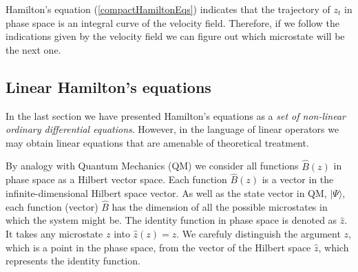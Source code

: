 \documentclass[b5paper,openright,11pt]{book}
\begin{document}
Hamilton's equation (\ref{compactHamiltonEqs}) indicates that the trajectory of $z_t$ in phase space is an integral curve of the velocity field. Therefore, if we follow the indications given by the velocity field we can figure out which microstate will be the next one. 


\subsection{Linear Hamilton's equations}
In the last section we have presented Hamilton's equations as a {\it set of non-linear ordinary differential equations}. However, in the language of linear operators we may obtain linear equations that are amenable of theoretical treatment. 

By analogy with Quantum Mechanics (QM) we consider all functions $\hat{B}(z)$ in phase space as a Hilbert vector space. 
Each function $\hat{B}(z)$ is a vector in the infinite-dimensional Hilbert space vector. 
As well as the state vector in QM, $|\Psi\rangle$, each function (vector) $\hat{B}$ has the dimension of all the possible microstates in which the system might be. 
The identity function in phase space is denoted as $\hat{z}$. It takes any microstate $z$ into $\hat{z}(z)=z$. 
We carefuly distinguish the argument $z$, which is a point in the phase space, from the vector of the Hilbert space $\hat{z}$, which represents the identity function.
\end{document}
